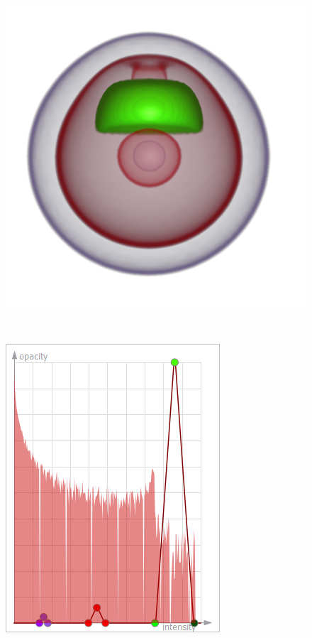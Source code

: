 \begin{figure}
	\centering
	\begin{minipage}{.35\textwidth}
		\includegraphics[width=1\linewidth]{images/nucleon_strong_red_optimized_fixed}
	\end{minipage}~
	\begin{minipage}{.2\textwidth}
		\includegraphics[width=1\linewidth]{images/tf_nucleon_strong_red_optimized_fixed}

\end{minipage}
\end{figure}
